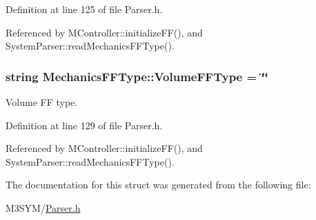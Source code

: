 Definition at line 125 of file Parser.\+h.



Referenced by M\+Controller\+::initialize\+F\+F(), and System\+Parser\+::read\+Mechanics\+F\+F\+Type().

\hypertarget{structMechanicsFFType_a5f694c3765d3856e1987c22d167490a7}{
\subsubsection[{Volume\+F\+F\+Type}]{\setlength{\rightskip}{0pt plus 5cm}string Mechanics\+F\+F\+Type\+::\+Volume\+F\+F\+Type = \char`\"{}\char`\"{}}}\label{structMechanicsFFType_a5f694c3765d3856e1987c22d167490a7}


Volume F\+F type. 



Definition at line 129 of file Parser.\+h.



Referenced by M\+Controller\+::initialize\+F\+F(), and System\+Parser\+::read\+Mechanics\+F\+F\+Type().



The documentation for this struct was generated from the following file\+:\begin{DoxyCompactItemize}
\item 
M3\+S\+Y\+M/\hyperlink{Parser_8h}{Parser.\+h}\end{DoxyCompactItemize}
